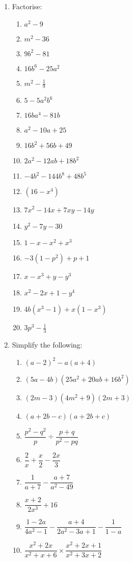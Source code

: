 \begin{eocexercises}{}
\begin{enumerate}[itemsep=5pt, label=\textbf{\arabic*}. ]
\item Factorise:
\begin{multicols}{2}
\begin{enumerate}[itemsep=5pt, label=\textbf{(\alph*)} ] 
\item ${a}^{2}-9$
\item ${m}^{2}-36$
\item $9{b}^{2}-81$
\item $16{b}^{6}-25{a}^{2}$
\item ${m}^{2}-\frac{1}{9}$
\item $5-5{a}^{2}{b}^{6}$
\item $16b{a}^{4}-81b$
\item ${a}^{2}-10a+25$
\item $16{b}^{2}+56b+49$
\item $2{a}^{2}-12ab+18{b}^{2}$
\item $-4{b}^{2}-144{b}^{8}+48{b}^{5}$
\item $(16-{x}^{4})$
\item ${7x}^{2}-14x+7xy-14y$
\item ${y}^{2}-7y-30$
\item $1-x-{x}^{2}+{x}^{3}$
\item $-3(1-{p}^{2})+p+1$
\item $x-x^{3} + y - y^{3}$
\item $x^{2} - 2x + 1 - y^{4}$
\item $4b(x^{3} - 1) + x(1-x^{3})$
\item $3p^{3} - \frac{1}{3}$
\end{enumerate}
\end{multicols}


\item Simplify the following:
\begin{multicols}{2}
\begin{enumerate}[itemsep=5pt, label=\textbf{(\alph*)} ] 

\item ${(a-2)}^{2}-a(a+4)$
\item $(5a-4b)(25{a}^{2}+20ab+16{b}^{2})$
\item $(2m-3)(4{m}^{2}+9)(2m+3)$
\item $(a+2b-c)(a+2b+c)$
\item $\dfrac{{p}^{2}-{q}^{2}}{p}÷\dfrac{p+q}{{p}^{2}-pq}$
\item $\dfrac{2}{x}+\dfrac{x}{2}-\dfrac{2x}{3}$
\item $\dfrac{1}{a+7}-\dfrac{a+7}{a^{2}-49}$
\item $\dfrac{x+2}{2x^{3}} + 16$
\item $\dfrac{1-2a}{4a^{2} -1} - \dfrac{a+4}{2a^{2}-3a+1} - \dfrac{1}{1-a}$
\item $\dfrac{x^{2} + 2x}{x^{2}+ x + 6} \times \dfrac{x^{2} + 2x + 1}{x^{2} + 3x +2}$
\end{enumerate}
\end{multicols}



\end{enumerate}
\end{eocexercises}
